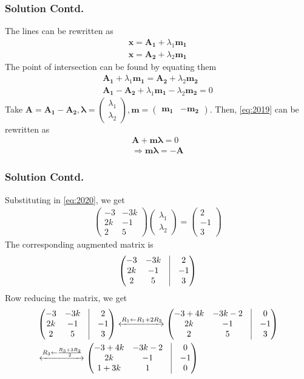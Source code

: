 \documentclass{beamer}
\newcommand{\myvec}[1]{\ensuremath{\begin{pmatrix}#1\end{pmatrix}}}
\renewcommand{\vec}[1]{\mathbf{#1}}
\begin{document}
\begin{frame}
\frametitle{Solution Contd.}
The lines can be rewritten as
\begin{align}
    \vec{x}=\vec{A_{1}}+\lambda_{1}\vec{m_{1}}\label{eq:form}\\
    \vec{x}=\vec{A_{2}}+\lambda_{2}\vec{m_{1}}
\end{align}
The point of intersection can be found by equating them
\begin{align}
    \vec{A_{1}}+\lambda_{1}\vec{m_{1}}=\vec{A_{2}}+\lambda_{2}\vec{m_{2}}\\
    \vec{A_{1}}-\vec{A_{2}}+\lambda_{1}\vec{m_{1}}-\lambda_{2}\vec{m_{2}}=0\label{eq:2019}
\end{align}
Take $\vec{A}=\vec{A_{1}}-\vec{A_{2}},\vec{\lambda}=\myvec{\lambda_{1}\\\lambda_{2}},\vec{m}=\myvec{\vec{m_{1}} & -\vec{m_{2}}}$. Then, \eqref{eq:2019} can be rewritten as
\begin{align}
    \vec{A}+\vec{m}\vec{\lambda}=0\\
    \Rightarrow\vec{m}\vec{\lambda}=-\vec{A}\label{eq:2020}
\end{align}
\end{frame}

\begin{frame}
\frametitle{Solution Contd.}
Substituting in \eqref{eq:2020}, we get
\begin{align}
    \myvec{-3 & -3k\\
    2k & -1\\
    2 &  5}\myvec{\lambda_{1}\\\lambda_{2}}=\myvec{2\\-1\\3}
\end{align}
The corresponding augmented matrix is 
\begin{align}
    \myvec{-3 & -3k & \vrule & 2\\
    2k & -1 & \vrule & -1\\
    2 &  5 & \vrule & 3}
\end{align}
Row reducing the matrix, we get
\begin{align}
    &\myvec{-3 & -3k & \vrule & 2\\
    2k & -1 & \vrule & -1\\
    2 &  5 & \vrule & 3}\xleftrightarrow{R_1\leftarrow R_{1}+2R_{2}}\myvec{-3+4k & -3k-2 & \vrule & 0\\
    2k & -1 & \vrule & -1\\
    2 &  5 & \vrule & 3}\\
    &\xleftrightarrow{R_3\leftarrow \frac{R_{3}+3R_{2}}{2}}\myvec{-3+4k & -3k-2 & \vrule & 0\\
    2k & -1 & \vrule & -1\\
    1+3k &  1 & \vrule & 0}   
\end{align}
\end{frame}
\end{document}

